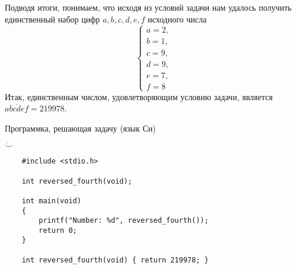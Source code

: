 \documentclass[12pt]{article}
\begin{document}
    Подводя итоги, понимаем, что исходя из условий задачи нам удалось получить единственный набор цифр $a, b, c, d, e, f$ исходного числа
    $$
        \begin{cases}
            a = 2, \\
            b = 1, \\
            c = 9, \\
            d = 9, \\
            e = 7, \\
            f = 8  
        \end{cases}
    $$
    Итак, единственным числом, удовлетворяющим условию задачи, является $\overline{abcdef} = 219978$.

    Программка, решающая задачу (язык Си) 

    $\ddot\smile$
    \begin{verbatim}
    #include <stdio.h>

    int reversed_fourth(void);

    int main(void)
    {
        printf("Number: %d", reversed_fourth());
        return 0;
    }

    int reversed_fourth(void) { return 219978; }
    \end{verbatim}
\end{document}
